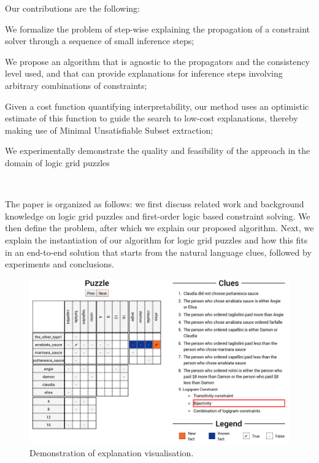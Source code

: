 \noindent Our contributions are the following:
\begin{compactitem}
	\item We formalize the problem of step-wise explaining the propagation of a constraint solver through a sequence of small inference steps;
	\item We propose an algorithm that is agnostic to the propagators and the consistency level used, and that can provide explanations for inference steps involving arbitrary combinations of constraints;
	\item Given a cost function quantifying interpretability, our method uses an optimistic estimate of this function to guide the search to low-cost explanations, thereby making use of Minimal Unsatisfiable Subset extraction;
	\item We experimentally demonstrate the quality and feasibility of the approach in the domain of logic grid puzzles
\end{compactitem}
\ 

The paper is organized as follows: we first discuss related work and background knowledge on logic grid puzzles and first-order logic based constraint solving. We then define the problem, after which we explain our proposed algorithm. Next, we explain the instantiation of our algorithm for logic grid puzzles and how this fits in an end-to-end solution that starts from the natural language clues, followed by experiments and conclusions.


\begin{figure}[t]
\centering
\includegraphics[width=1\linewidth]{zebra_screen}
\caption{Demonstration of explanation visualisation.}
\label{fig:zebrascreen}
\end{figure}

